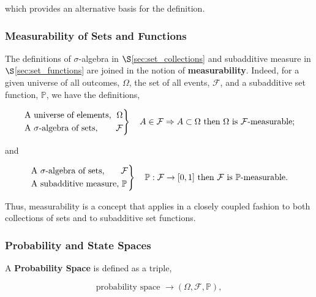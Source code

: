 \documentclass[12pt, twoside, draft]{article}
\begin{document}
which provides an alternative basis for the definition.

\subsubsection{Measurability of Sets and Functions}

The definitions of $\sigma$-algebra in $\S$\ref{sec:set_collections} and subadditive measure in $\S$\ref{sec:set_functions} are joined in the notion of \textbf{measurability}.  Indeed, for a given universe of all outcomes, $\Omega$, the set of all events, $\mathcal{F}$, and a subadditive set function, $\mathbb{P}$, we have the definitions,

\begin{equation}
\begin{rcases}
\text{A universe of elements, } \hspace{3pt} \Omega\\
\text{A } \sigma\text{-algebra of sets, } \hspace{18pt} \mathcal{F}
\end{rcases} \hspace{10pt} A \in \mathcal{F} \Rightarrow A \subset \Omega\text{ then } \Omega \text{ is } \mathcal{F}\text{-measurable;}
\end{equation}

and

\begin{equation}
\begin{rcases}
\text{A } \sigma\text{-algebra of sets, } \hspace{16pt} \mathcal{F} \\ 
\text{A subadditive measure, } \mathbb{P}
\end{rcases} \hspace{10pt} \mathbb{P}:\mathcal{F} \rightarrow [0,1] \text{ then } \mathcal{F} \text{ is } \mathbb{P}\text{-measurable.}
\end{equation}

Thus, measurability is a concept that applies in a closely coupled fashion to both collections of sets and to subadditive set functions.

\subsubsection{Probability and State Spaces}

A \textbf{Probability Space} is defined as a triple, 

\begin{equation}
\text {probability space } \rightarrow (\Omega, \mathcal{F}, \mathbb{P}), 
\end{equation}
\end{document}
